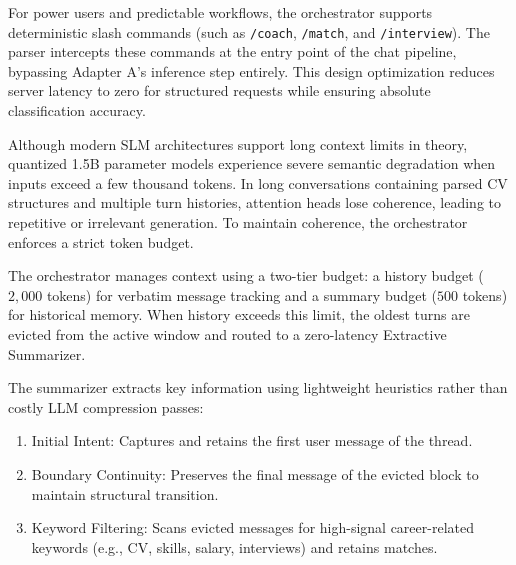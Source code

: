\documentclass[12pt, a4paper]{report}
\begin{document}
\vspace{0.3cm}

For power users and predictable workflows, the orchestrator supports deterministic slash commands (such as \texttt{/coach}, \texttt{/match}, and \texttt{/interview}). The parser intercepts these commands at the entry point of the chat pipeline, bypassing Adapter A's inference step entirely. This design optimization reduces server latency to zero for structured requests while ensuring absolute classification accuracy.

\vspace{0.6cm}
\vspace{0.4cm}

\vspace{0.3cm}

Although modern SLM architectures support long context limits in theory, quantized 1.5B parameter models experience severe semantic degradation when inputs exceed a few thousand tokens. In long conversations containing parsed CV structures and multiple turn histories, attention heads lose coherence, leading to repetitive or irrelevant generation. To maintain coherence, the orchestrator enforces a strict token budget.

\vspace{0.3cm}

The orchestrator manages context using a two-tier budget: a history budget ($2,000$ tokens) for verbatim message tracking and a summary budget ($500$ tokens) for historical memory. When history exceeds this limit, the oldest turns are evicted from the active window and routed to a zero-latency Extractive Summarizer.

The summarizer extracts key information using lightweight heuristics rather than costly LLM compression passes:
\begin{enumerate}
    \item Initial Intent: Captures and retains the first user message of the thread.
    \item Boundary Continuity: Preserves the final message of the evicted block to maintain structural transition.
    \item Keyword Filtering: Scans evicted messages for high-signal career-related keywords (e.g., CV, skills, salary, interviews) and retains matches.
\end{enumerate}
\end{document}
